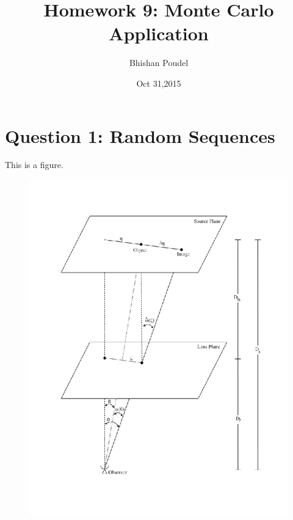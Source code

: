 \documentclass[11pt,a4paper,english]{article}
\title{Homework 9: Monte Carlo Application}
\author{Bhishan Poudel}
\date{Oct 31,2015}
\begin{document}
\maketitle
\tableofcontents
\listoffigures
\clearpage


\section{Question 1: Random Sequences }

This is a figure.
	\begin{figure}[h!]
	\centering
	\includegraphics [scale=0.6,angle=0]{lensing}
	\caption{ }
	\end{figure}
\end{document}
